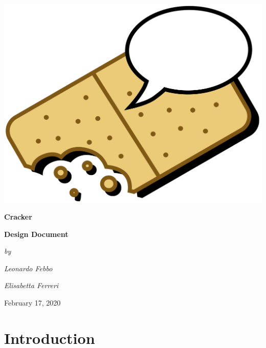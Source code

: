 \begin{titlepage}
\begin{center}
\includegraphics[scale=0.5]{img/logo}
\vspace{8mm}

{\textbf{\Huge{Cracker}}}
\vspace{10mm}

{\textbf{\Large{Design Document}}}
\vspace{25mm}

{\slshape{\Large{by}}} 
\vspace{3mm}

{\slshape{\Large{Leonardo Febbo}}} 
\vspace{3mm}

{\slshape{\Large{Elisabetta Ferreri}}}

\vfill
{\large{February 17, 2020}}

\end{center}

\end{titlepage}

\setcounter{page}{2}


\newpage
{
	\hypersetup{linkcolor=black}
	\tableofcontents
}
\clearpage
{\section{Introduction}}
\label{sect:introduction}


